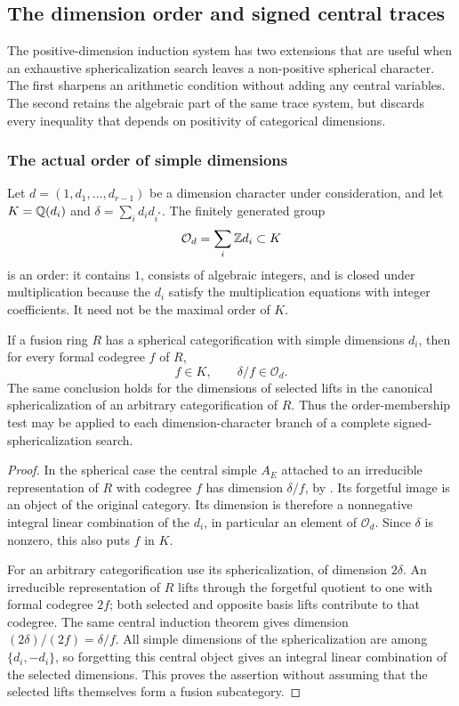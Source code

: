 \subsection{The dimension order and signed central traces}\label{sec:dimension-order}
The positive-dimension induction system has two extensions that are useful
when an exhaustive sphericalization search leaves a non-positive
spherical character. The first sharpens an arithmetic condition without
adding any central variables. The second retains the algebraic part of
the same trace system, but discards every inequality that depends on
positivity of categorical dimensions.

\subsubsection{The actual order of simple dimensions}
Let $d=(1,d_1,\ldots,d_{r-1})$ be a dimension character under
consideration, and let $K=\mathbb Q(d_i)$ and $\delta=\sum_i d_i d_{i^*}$.
The finitely generated group
\[
 \mathcal O_d=\sum_i\mathbb Z d_i\subset K
\]
is an order: it contains $1$, consists of algebraic integers, and is
closed under multiplication because the $d_i$ satisfy the multiplication
equations with integer coefficients. It need not be the maximal order
of $K$.

\begin{proposition}\label{prop:dimension-order}
If a fusion ring $R$ has a spherical categorification with simple
dimensions $d_i$, then for every formal codegree $f$ of $R$,
\begin{equation}\label{eq:dimension-order}
 f\in K,\qquad \delta/f\in\mathcal O_d.
\end{equation}
The same conclusion holds for the dimensions of selected lifts in the
canonical sphericalization of an arbitrary categorification of $R$.
Thus the order-membership test may be applied to each dimension-character
branch of a complete signed-sphericalization search.
\end{proposition}
\begin{proof}
In the spherical case the central simple $A_E$ attached to an irreducible
representation of $R$ with codegree $f$ has dimension $\delta/f$, by
\cite[Theorem~2.13]{Ostrik3}. Its forgetful image is an object of the
original category. Its dimension is therefore a nonnegative integral
linear combination of the $d_i$, in particular an element of
$\mathcal O_d$. Since $\delta$ is nonzero, this also puts $f$ in $K$.

For an arbitrary categorification use its sphericalization, of dimension
$2\delta$. An irreducible representation of $R$ lifts through the
forgetful quotient to one with formal codegree $2f$; both selected and
opposite basis lifts contribute to that codegree. The same central
induction theorem gives dimension $(2\delta)/(2f)=\delta/f$.
All simple dimensions of the sphericalization are among $\{d_i,-d_i\}$,
so forgetting this central object gives an integral linear combination
of the selected dimensions. This proves the assertion without assuming
that the selected lifts themselves form a fusion subcategory.
\end{proof}

